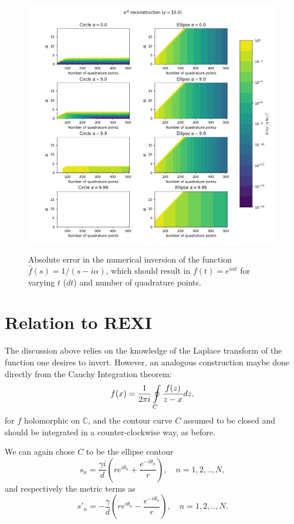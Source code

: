 \documentclass[10pt,a4paper,final]{article}
\begin{document}
\begin{figure}[h!]
\centering
\includegraphics[scale=0.7]{nilt_expix_error}
\label{fig:const_trunc16}
\caption{Absolute error in the numerical inversion of the function $\widehat{f}(s)=1/(s-i\alpha)$, which should result in $f(t)=e^{i\alpha t}$ for varying $t$ ($dt$) and number of quadrature points. }
\end{figure}

\section{Relation to REXI }

The discussion above relies on the knowledge of the Laplace transform of the function one desires to invert. However, an analogous construction maybe done directly from the Cauchy Integration theorem:
\begin{equation}
f(x)=\frac{1}{2\pi i}\ointop_{C}\frac{f(z)}{z-x}dz,
\end{equation}
for $f$ holomorphic on $\mathbb{C}$, and the contour curve $C$ assumed to be closed and should be integrated in a counter-clockwise way, as before.

We can again chose $C$ to be the ellipse contour
\begin{equation}
s_n=\frac{\gamma i}{d}\left(re^{i\theta_n}+\frac{e^{-i\theta_n}}{r}\right), \quad n=1,2,..,N,
\end{equation}
and respectively the metric terms as
\begin{equation}
s'_n=-\frac{\gamma}{d}\left(re^{i\theta_n}-\frac{e^{-i\theta_n}}{r}\right),  \quad n=1,2,..,N.
\end{equation}
\end{document}
